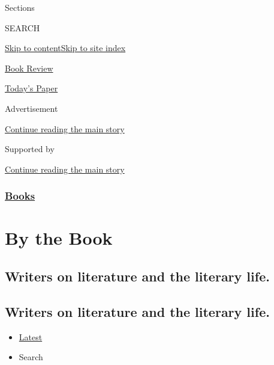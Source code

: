 Sections

SEARCH

\protect\hyperlink{site-content}{Skip to
content}\protect\hyperlink{site-index}{Skip to site index}

\href{https://www.nytimes3xbfgragh.onion/section/books/review}{Book
Review}

\href{https://myaccount.nytimes3xbfgragh.onion/auth/login?response_type=cookie\&client_id=vi}{}

\href{https://www.nytimes3xbfgragh.onion/section/todayspaper}{Today's
Paper}

Advertisement

\protect\hyperlink{after-top}{Continue reading the main story}

Supported by

\protect\hyperlink{after-sponsor}{Continue reading the main story}

\hypertarget{books}{%
\subsubsection{\texorpdfstring{\href{/section/books}{Books}}{Books}}\label{books}}

\hypertarget{by-the-book}{%
\section{By the Book}\label{by-the-book}}

\hypertarget{writers-on-literature-and-the-literary-life}{%
\subsection{Writers on literature and the literary
life.}\label{writers-on-literature-and-the-literary-life}}

\hypertarget{writers-on-literature-and-the-literary-life-1}{%
\subsection{Writers on literature and the literary
life.}\label{writers-on-literature-and-the-literary-life-1}}

\begin{itemize}
\tightlist
\item
  \protect\hyperlink{stream-panel}{Latest}
\item
  Search
\end{itemize}

